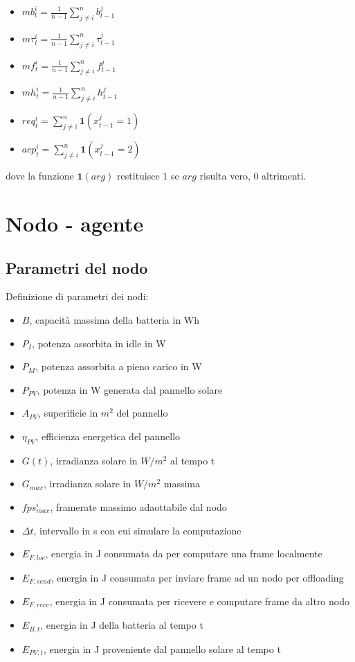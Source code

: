 \documentclass{article}
\begin{document}
\begin{itemize}

    \item $mb_t^i = \frac{1}{n-1} \sum_{j \neq i}^n b_{t-1}^j$
    \item $m\tau_t^i = \frac{1}{n-1} \sum_{j \neq i}^n \tau_{t-1}^j$
    \item $mf_t^i = \frac{1}{n-1} \sum_{j \neq i}^n f_{t-1}^j$
    \item $mh_t^i = \frac{1}{n-1} \sum_{j \neq i}^n h_{t-1}^j$
    \item $req_t^i = \sum_{j \neq i}^{n} \mathbf{1}(x_{t-1}^j = 1)$
    \item $acp_t^i = \sum_{j \neq i}^{n} \mathbf{1}(x_{t-1}^j = 2)$
     
\end{itemize}

dove la funzione $\mathbf{1}(arg)$ restituisce $1$ se $arg$ risulta vero, $0$ altrimenti.

\section{Nodo - agente}
\subsection{Parametri del nodo}
Definizione di parametri dei nodi:
\begin{itemize}
    \item $B$, capacità massima della batteria in Wh
    \item $P_I$, potenza assorbita in idle in W
    \item $P_M$, potenza assorbita a pieno carico in W
    \item $P_{PV}$, potenza in W generata dal pannello solare
    \item $A_{PV}$, superificie in $m^2$ del pannello
    \item $\eta_{PV}$, efficienza energetica del pannello
    \item $G(t)$, irradianza solare in $W/m^2$ al tempo t
    \item $G_{max}$, irradianza solare in $W/m^2$ massima
    \item $fps_{max}^i$, framerate massimo adaottabile dal nodo
    \item $\Delta t$, intervallo in s con cui simulare la computazione
    \item $E_{F, loc}$, energia in J consumata da per computare una frame localmente
    \item $E_{F, send}$, energia in J consumata per inviare frame ad un nodo per offloading
    \item $E_{F, recv}$, energia in J consumata per ricevere e computare frame da altro nodo
    \item $E_{B, t}$, energia in J della batteria al tempo t
    \item $E_{PV, t}$, energia in J proveniente dal pannello solare al tempo t
\end{itemize}
\end{document}
